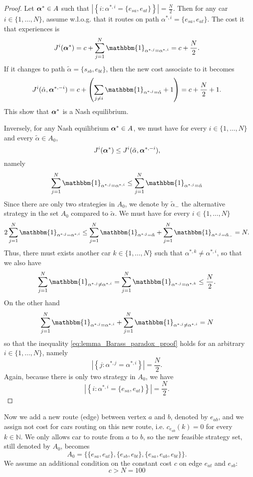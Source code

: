 \begin{proof}
	Let $\boldsymbol{\alpha}^* \in A $ such that $\left\vert \left\{ i : \alpha^{*,i} = \{e_{sa}, e_{at}\}  \right\}\right\vert = \frac{N}{2}$. Then for any car $i \in \{1,\ldots,N\}$, assume w.l.o.g. that it routes on path $\alpha^{*,i} = \{e_{sa}, e_{at}\}$. The cost it that experiences is
	$$
	J^i( \balpha^{*}) = c + \sum_{j = 1}^N \mathbbm{1}_{ \alpha^{*,j} = \alpha^{*,i}} = c + \frac{N}{2} .
	$$
	If it changes to path $\tilde{\alpha} = \{s_{sb}, e_{bt}\}$, then the new cost associate to it becomes
	$$
		J^i( \tilde{\alpha}, \balpha^{*,-i}) = c + \left( \sum_{j\neq i} \mathbbm{1}_{ \alpha^{*,j} = \tilde{\alpha}} +1 \right) = c + \frac{N}{2} + 1.
 	$$
 	This show that $\boldsymbol{\alpha}^*$ is a Nash equilibrium.
 	
 	Inversely, for any Nash equilibrium $\boldsymbol{\alpha}^* \in A$, we must have for every $i \in \{1,\ldots, N\}$ and every $\tilde{\alpha} \in A_0$,
 	$$
 		J^i(\boldsymbol{\alpha}^*) \leq J^i(\tilde{\alpha}, \boldsymbol{\alpha}^{*, -i}),
 	$$
 	namely
 	$$
 		\sum_{j=1}^N \mathbbm{1}_{\alpha^{*,j} = \alpha^{*,i}  }\leq \sum_{j=1}^N \mathbbm{1}_{\alpha^{*,j} = \tilde{\alpha} }
 	$$
 	Since there are only two strategies in $A_0$, we denote by $\tilde{\alpha}_{-}$ the alternative strategy in the set $A_0$ compared to $\tilde{\alpha}$. We must have for every $i \in \{1,\ldots,N\}$
 	\begin{equation}
 		2 \sum_{j=1}^N \mathbbm{1}_{\alpha^{*,j} = \alpha^{*,i} } \leq 	\sum_{j=1}^N \mathbbm{1}_{\alpha^{*,j} = \tilde{\alpha}}  + \sum_{j=1}^N \mathbbm{1}_{\alpha^{*,j} = \tilde{\alpha}_{-}} = N.
 	\label{eq:lemma_Barass_paradox_proof}
  	\end{equation}
	Thus, there must exists another car $k \in \{1,\ldots, N\}$ such that $\alpha^{*,k} \neq \alpha^{*,i}$, so that we also have
	$$
		\sum_{j=1}^N \mathbbm{1}_{\alpha^{*,j} \neq \alpha^{*,i} }  = \sum_{j=1}^N \mathbbm{1}_{\alpha^{*,j} = \alpha^{*, k} } \leq \frac{N}{2}.
	$$
	On the other hand
	$$
	\sum_{j=1}^N \mathbbm{1}_{\alpha^{*,j} = \alpha^{*,i} }  + 	\sum_{j=1}^N \mathbbm{1}_{\alpha^{*,j} \neq \alpha^{*,i} } = N
	$$
	so that the inequality \eqref{eq:lemma_Barass_paradox_proof} holds for an arbitrary $i \in \{1,\ldots,N\}$, namely
	$$
		\left\vert \left\{ j : \alpha^{*,j} = \alpha^{*,i} \right\} \right\vert = \frac{N}{2}.
	$$
	Again, because there is only two strategy in $A_0$, we have
	$$ \left\vert \left\{ i : \alpha^{*,i} = \{e_{sa}, e_{at}\}  \right\}\right\vert = \frac{N}{2}.
	$$	 	
\end{proof}


Now we add a new route (edge) between vertex $a$ and $b$, denoted by $e_{ab}$, and we assign not cost for cars routing on this new route, i.e. $c_{e_{ab}}(k) = 0$ for every $k \in \mathbb{N}$. We only allows car to route from $a$ to $b$, so the new feasible strategy set, still denoted by $A_0$, becomes
$$
	A_0 =  \{ \{e_{sa}, e_{at} \}, \{ e_{sb}, e_{bt} \}, \{ e_{sa}, e_{ab}, e_{bt} \} \}.
$$
We assume an additional condition on the constant cost $c$ on edge $e_{at}$ and $e_{sb}$:
\begin{equation}
	c > N =100
\end{equation}

